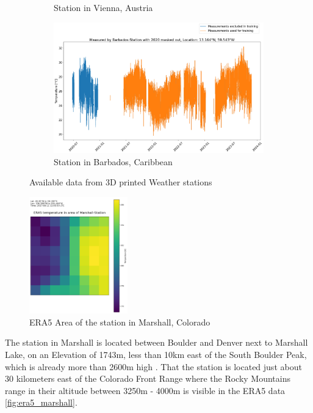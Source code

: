 \begin{figure}
\begin{subfigure}{0.672\textwidth}
        \caption{Station in Vienna, Austria}
        \label{fig:available_measurements_vienna}
    \end{subfigure}
    \begin{subfigure}{0.672\textwidth}
        \includegraphics[width=\textwidth]{resources/images/charts/barbados_available_measurements.png}
        \caption{Station in Barbados, Caribbean}
        \label{fig:available_measurements_barbados}
    \end{subfigure}
    \caption{Available data from 3D printed Weather stations}
    \label{fig:weather_stations}
\end{figure}

\begin{figure}
    \centering
    \includegraphics[width=0.38\textwidth]{resources/images/Marshall_era5.png}
    \caption{ERA5 Area of the station in Marshall, Colorado}
    \label{fig:era5_marshall}
\end{figure}


The station in Marshall is located between Boulder and Denver next to Marshall Lake, on an Elevation of 1743m, less than 10km east of the South Boulder Peak, which is already more than 2600m high \cite{southboulderpeak}. That the station is located just about 30 kilometers east of the Colorado Front Range where the Rocky Mountains range in their altitude between 3250m - 4000m \cite{Williams1996} is visible in the ERA5 data \autoref{fig:era5_marshall}.

